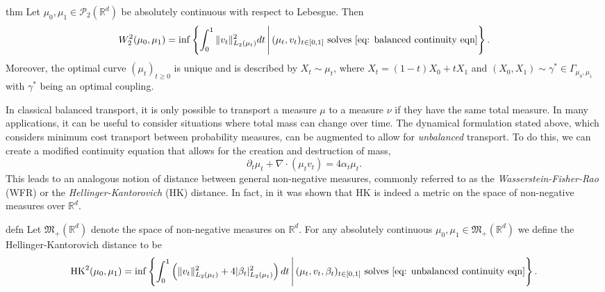 \documentclass[11pt]{article}
\begin{document}
\begin{restatable}{thm}{}
    Let $\mu_0, \mu_1 \in \mathcal{P}_{2}(\mathbb{R}^d)$ be absolutely continuous with respect to Lebesgue. Then 
    \begin{equation*}
        W_2^2(\mu_0, \mu_1) = \inf \left\{\int_{0}^1\|v_t\|^2_{L_2(\mu_t)} dt \, \Bigg| \, (\mu_t, v_t)_{t \in [0,1]} \text{ solves \cref{eq: balanced continuity eqn}}\right\}.
    \end{equation*}
    Moreover, the optimal curve $(\mu_t)_{t\geq 0}$ is unique and is described by $X_t \sim \mu_t$, where $X_t = (1-t)X_0 + tX_1$ and $(X_0, X_1) \sim \gamma^* \in \Gamma_{\mu_0, \mu_1}$ with $\gamma^*$ being an optimal coupling.
\end{restatable}

In classical balanced transport, it is only possible to transport a measure $\mu$ to a measure $\nu$ if they have the same total measure. In many applications, it can be useful to consider situations where total mass can change over time. The dynamical formulation stated above, which considers minimum cost transport between probability measures, can be augmented to allow for \textit{unbalanced} transport. To do this, we can create a modified continuity equation that allows for the creation and destruction of mass,
\begin{equation}
    \partial_t\mu_t + \nabla \cdot (\mu_tv_t) = 4\alpha_t\mu_t. \label{eq: unbalanced continuity eqn}
\end{equation}
This leads to an analogous notion of distance between general non-negative measures, commonly referred to as the \textit{Wasserstein-Fisher-Rao} (WFR) or the \textit{Hellinger-Kantorovich} (HK) distance. In fact, in \citet{liero2018optimal} it was shown that HK is indeed a metric on the space of non-negative measures over $\mathbb{R}^d$. 

\begin{restatable}{defn}{}
    Let $\mathfrak{M}_+(\mathbb{R}^d)$ denote the space of non-negative measures on $\mathbb{R}^d$. For any absolutely continuous $\mu_0, \mu_1 \in \mathfrak{M}_+(\mathbb{R}^d)$ we define the Hellinger-Kantorovich distance to be
    \begin{equation}
        \text{HK}^2(\mu_0, \mu_1) = \inf\left\{\int_0^1 \left(\|v_t\|_{L_2(\mu_t)}^2 + 4|\beta_t|_{L_2(\mu_t)}^2\right)dt \, \Bigg| \, (\mu_t, v_t,  \beta_t)_{t\in [0,1]} \text{ solves \cref{eq: unbalanced continuity eqn}}\right\}.
    \end{equation}
\end{restatable}
\end{document}
